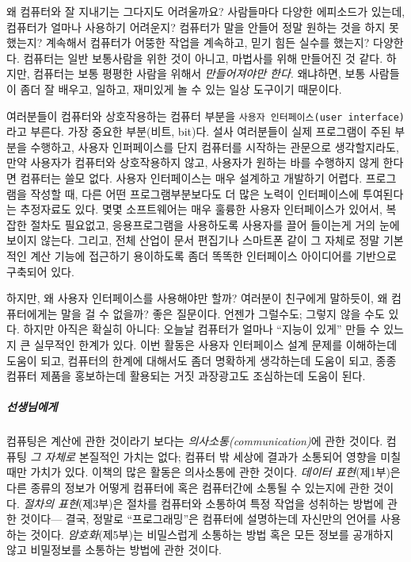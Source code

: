 \documentclass[]{article}
\begin{document}
왜 컴퓨터와 잘 지내기는 그다지도 어려울까요? 사람들마다 다양한
에피소드가 있는데, 컴퓨터가 얼마나 사용하기 어려운지? 컴퓨터가 말을
안들어 정말 원하는 것을 하지 못했는지? 계속해서 컴퓨터가 어뚱한 작업을
계속하고, 믿기 힘든 실수를 했는지? 다양한다. 컴퓨터는 일반 보통사람을
위한 것이 아니고, 마법사를 위해 만들어진 것 같다. 하지만, 컴퓨터는 보통
평평한 사람을 위해서 \emph{만들어져야만 한다}. 왜냐하면, 보통 사람들이
좀더 잘 배우고, 일하고, 재미있게 놀 수 있는 일상 도구이기 때문이다.

여러분들이 컴퓨터와 상호작용하는 컴퓨터 부분을
\texttt{사용자 인터페이스(user interface)}라고 부른다. 가장 중요한
부분(비트, bit)다. 설사 여러분들이 실제 프로그램이 주된 부분을 수행하고,
사용자 인퍼페이스를 단지 컴퓨터를 시작하는 관문으로 생각할지라도, 만약
사용자가 컴퓨터와 상호작용하지 않고, 사용자가 원하는 바를 수행하지 않게
한다면 컴퓨터는 쓸모 없다. 사용자 인터페이스는 매우 설계하고 개발하기
어렵다. 프로그램을 작성할 때, 다른 어떤 프로그램부분보다도 더 많은
노력이 인터페이스에 투여된다는 추정자료도 있다. 몇몇 소프트웨어는 매우
훌륭한 사용자 인터페이스가 있어서, 복잡한 절차도 필요없고,
응용프로그램을 사용하도록 사용자를 끌어 들이는게 거의 눈에 보이지
않는다. 그리고, 전체 산업이 문서 편집기나 스마트폰 같이 그 자체로 정말
기본적인 계산 기능에 접근하기 용이하도록 좀더 똑똑한 인터페이스
아이디어를 기반으로 구축되어 있다.

하지만, 왜 사용자 인터페이스를 사용해야만 할까? 여러분이 친구에게
말하듯이, 왜 컴퓨터에게는 말을 걸 수 없을까? 좋은 질문이다. 언젠가
그럴수도; 그렇지 않을 수도 있다. 하지만 아직은 확실히 아니다: 오늘날
컴퓨터가 얼마나 ``지능이 있게'' 만들 수 있느지 큰 실무적인 한계가 있다.
이번 활동은 사용자 인터페이스 설계 문제를 이해하는데 도움이 되고,
컴퓨터의 한계에 대해서도 좀더 명확하게 생각하는데 도움이 되고, 종종
컴퓨터 제품을 홍보하는데 활용되는 거짓 과장광고도 조심하는데 도움이
된다.

\subparagraph{선생님에게}\label{section-256}

컴퓨팅은 계산에 관한 것이라기 보다는 \emph{의사소통(communication)}에
관한 것이다. 컴퓨팅 \emph{그 자체로} 본질적인 가치는 없다; 컴퓨터 밖
세상에 결과가 소통되어 영향을 미칠 때만 가치가 있다. 이책의 많은 활동은
의사소통에 관한 것이다. \emph{데이터 표현}(제1부)은 다른 종류의 정보가
어떻게 컴퓨터에 혹은 컴퓨터간에 소통될 수 있는지에 관한 것이다.
\emph{절차의 표현}(제3부)은 절차를 컴퓨터와 소통하여 특정 작업을
성취하는 방법에 관한 것이다--- 결국, 정말로 ``프로그래밍''은 컴퓨터에
설명하는데 자신만의 언어를 사용하는 것이다. \emph{암호화}(제5부)는
비밀스럽게 소통하는 방법 혹은 모든 정보를 공개하지 않고 비밀정보를
소통하는 방법에 관한 것이다.
\end{document}
